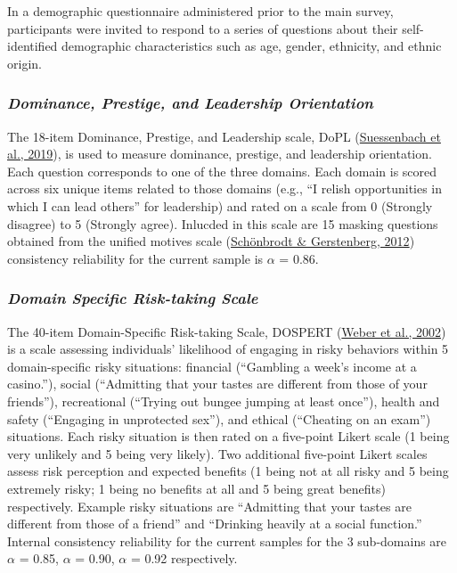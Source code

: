 \documentclass[
  donotrepeattitle,doc, 12pt, a4paper,floatsintext]{apa7}
\begin{document}
In a demographic questionnaire administered prior to the main survey, participants were invited to respond to a series of questions about their self-identified demographic characteristics such as age, gender, ethnicity, and ethnic origin.
\hypertarget{dominance-prestige-and-leadership-orientation-1}{%
\subsubsection{\texorpdfstring{\emph{Dominance, Prestige, and Leadership Orientation}}{Dominance, Prestige, and Leadership Orientation}}\label{dominance-prestige-and-leadership-orientation-1}}
The 18-item Dominance, Prestige, and Leadership scale, DoPL (\protect\hyperlink{ref-suessenbach2019}{Suessenbach et al., 2019}), is used to measure dominance, prestige, and leadership orientation. Each question corresponds to one of the three domains. Each domain is scored across six unique items related to those domains (e.g., ``I relish opportunities in which I can lead others'' for leadership) and rated on a scale from 0 (Strongly disagree) to 5 (Strongly agree). Inlucded in this scale are 15 masking questions obtained from the unified motives scale (\protect\hyperlink{ref-schonbrodt2012}{Schönbrodt \& Gerstenberg, 2012}) consistency reliability for the current sample is \(\alpha\) = 0.86.
\hypertarget{domain-specific-risk-taking-scale}{%
\subsubsection{\texorpdfstring{\emph{Domain Specific Risk-taking Scale}}{Domain Specific Risk-taking Scale}}\label{domain-specific-risk-taking-scale}}
The 40-item Domain-Specific Risk-taking Scale, DOSPERT (\protect\hyperlink{ref-weber2002}{Weber et al., 2002}) is a scale assessing individuals' likelihood of engaging in risky behaviors within 5 domain-specific risky situations: financial (``Gambling a week's income at a casino.''), social (``Admitting that your tastes are different from those of your friends''), recreational (``Trying out bungee jumping at least once''), health and safety (``Engaging in unprotected sex''), and ethical (``Cheating on an exam'') situations. Each risky situation is then rated on a five-point Likert scale (1 being very unlikely and 5 being very likely). Two additional five-point Likert scales assess risk perception and expected benefits (1 being not at all risky and 5 being extremely risky; 1 being no benefits at all and 5 being great benefits) respectively. Example risky situations are ``Admitting that your tastes are different from those of a friend'' and ``Drinking heavily at a social function.'' Internal consistency reliability for the current samples for the 3 sub-domains are \(\alpha\) = 0.85, \(\alpha\) = 0.90, \(\alpha\) = 0.92 respectively.
\end{document}
